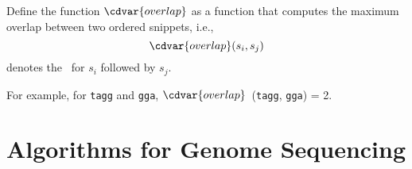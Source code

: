 \begin{definition}[Overlap]
\label{def:genome::prob::overlap}
Define the function $\cdvar{overlap}$ as a function that computes the
maximum overlap between two ordered snippets, i.e., 
\[
\cdvar{overlap}(s_i, s_j)
\]
denotes the ~for $s_i$ followed by $s_j$.
%

For example, for \texttt{tagg} and \texttt{gga}, $\cdvar{overlap}$~(\texttt{tagg}, \texttt{gga}) = 2.
\end{definition}












\section{Algorithms for Genome Sequencing}
\label{genome::alg}

